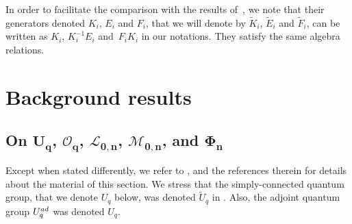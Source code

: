 \documentclass[11pt]{article}
\numberwithin{equation}{section}
\numberwithin{equation}{section}
\theoremstyle{definition}
\newcommand{\Ll}{{\mathcal L}}
\newcommand{\Mm}{{\mathcal M}}
\newcommand{\Oo}{{\mathcal O}}
\begin{document}
In order to facilitate the comparison with the results of~\cite{DC-L}, we note that their generators denoted $K_i$, $E_i$ and $F_i$, that we will denote by $\tilde{K}_i$, $\tilde{E}_i$ and $\tilde{F}_i$, can be written as $K_i$, $K_i^{-1}E_i$ and~$F_iK_i$ in our notations. They satisfy the same algebra relations.

\section{Background results}\label{PREL}

\subsection[On U\_q, O\_q, L\_{0,n}, M\_{0,n}, and Phi\_n]{On $\boldsymbol{U_q}$, $\boldsymbol{\Oo_q}$, $\boldsymbol{\Ll_{0,n}}$, $\boldsymbol{\Mm_{0,n}}$, and $\boldsymbol{\Phi_n}$}\label{ALGdef}
Except when stated differently, we refer to \cite[Sections 2--4 and 6]{BR}, and the references therein for details about the material of this section. We stress that the simply-connected quantum group, that we denote $U_q$ below, was denoted $\tilde U_q$ in \cite{BR}. Also, the adjoint quantum group $U_q^{\rm ad}$ was denoted $U_q$.
\end{document}
